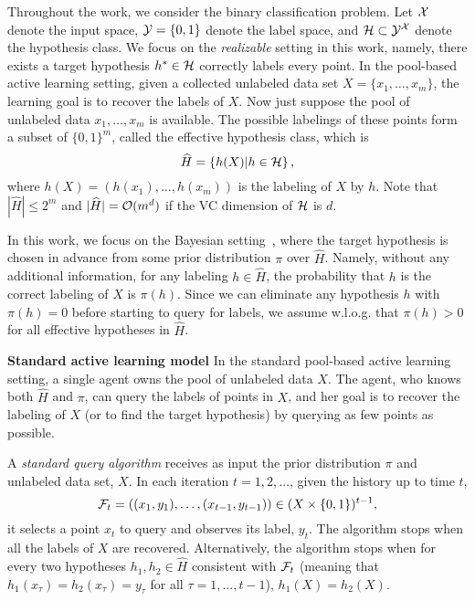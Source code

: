 Throughout the work, we consider the binary classification problem. 
Let $\mathcal{X}$ denote the input space, $\mathcal{Y} =\{0,1\}$ denote the label space, and $\mathcal{H}\subset \mathcal{Y}^{\mathcal{X}}$ denote the hypothesis class.
We focus on the \textit{realizable} setting in this work, namely, there exists a target hypothesis $h^*\in \mathcal{H}$ correctly labels every point.
In the pool-based active learning setting, given a collected unlabeled data set $X = \{x_1,\ldots,x_m\}$, the learning goal is to recover the labels of $X$.
Now just suppose the pool of unlabeled data $x_1,\ldots,x_m$ is available.
The possible labelings of these points form a subset of $\{0,1\}^m$, called the effective hypothesis class, which is 
\[\widehat H = \{h(X)|h\in \mathcal{H}\}\,,\]
where $h(X) = (h(x_1),\ldots, h(x_m))$ is the labeling of $X$ by $h$. Note that $|\hat H|\leq 2^m$
and $|\widehat H|= \mathcal{O}(m^d)$ if the VC dimension of $\mathcal{H}$ is $d$.

In this work, we focus on the Bayesian setting~\citep{dasgupta2004analysis}, where
the target hypothesis is chosen in advance 
from some prior distribution $\pi$ over $\hat H$. Namely, without any additional information, for any labeling $h\in \hat H$, the probability that $h$ is the correct labeling of $X$ is $\pi(h)$. Since we can  eliminate any hypothesis $h$ with $\pi(h)=0$ before starting to query for labels, we assume w.l.o.g. that $\pi(h)>0$ for all effective hypotheses in $\hat H$.


%

\textbf{Standard active learning model} In the standard pool-based active learning setting, 
a single agent owns the pool of unlabeled data $X$. 
The agent, who knows both $\hat H$ and $\pi$, can query the labels of points in $X$, and her goal is to recover the labeling of $X$ (or to find the target hypothesis) by querying as few points as possible. 

A \textit{standard query algorithm} receives as input the prior distribution $\pi$ and unlabeled data set, $X$. In each iteration  $t=1,2,\ldots$, given the history up to time $t$, $$\mathcal{F}_t =((x_1,y_1),\ldots,(x_{t-1},y_{t-1}))\in (X \times \{0,1\})^{t-1},$$ it selects a point $x_t$ to query and observes its label, $y_t$.  
The algorithm stops when all the labels of $X$ are recovered. Alternatively, the algorithm stops when for every two hypotheses $h_1,h_2\in \hat H$ consistent with $\mathcal{F}_t$ (meaning that $h_1(x_\tau) = h_2(x_\tau) = y_\tau$ for all $\tau=1,\ldots, t-1$), $h_1(X)=h_2(X)$. 






